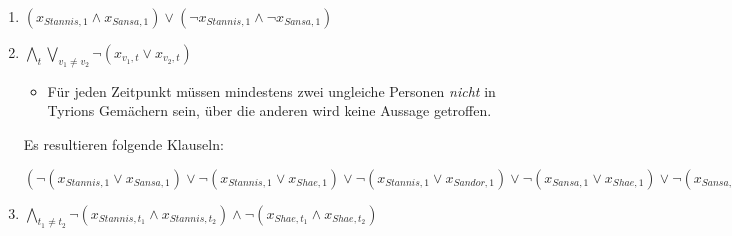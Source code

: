 \documentclass{article}
\begin{document}
\renewcommand{\labelenumi}{(\arabic{enumi})}
\begin{enumerate}
   \item $(x_{Stannis,1} \wedge x_{Sansa,1}) \vee (\neg x_{Stannis,1} \wedge
      \neg x_{Sansa,1})$
   \item $\bigwedge\limits_t\bigvee\limits_{v_1 \neq v_2} \neg(x_{v_1,t} \vee
      x_{v_2,t})$ 
      \begin{itemize}[label=$\rightarrow$]
         \item Für jeden Zeitpunkt müssen mindestens zwei ungleiche Personen
            \emph{nicht} in Tyrions Gemächern sein, über die anderen wird keine
            Aussage getroffen. 
      \end{itemize}
      Es resultieren folgende Klauseln:


      $ (\neg(x_{Stannis,1} \vee x_{Sansa,1}) \vee \neg(x_{Stannis,1} \vee
      x_{Shae,1}) \vee \neg(x_{Stannis,1} \vee x_{Sandor,1}) \vee
      \neg(x_{Sansa,1} \vee x_{Shae,1}) \vee \neg(x_{Sansa,1} \vee x_{Sandor,1})
      \vee \neg(x_{Shae,1} \vee x_{Sandor,1})) \wedge (\neg(x_{Stannis,2} \vee
      x_{Sansa,2}) \vee \neg(x_{Stannis,2} \vee x_{Shae,2}) \vee
      \neg(x_{Stannis,2} \vee x_{Sandor,2}) \vee \neg(x_{Sansa,2} \vee
      x_{Shae,2}) \vee \neg(x_{Sansa,2} \vee x_{Sandor,2}) \vee \neg(x_{Shae,2}
      \vee x_{Sandor,2})) \wedge (\neg(x_{Stannis,3} \vee x_{Sansa,3}) \vee
      \neg(x_{Stannis,3} \vee x_{Shae,3}) \vee \neg(x_{Stannis,3} \vee
      x_{Sandor,3}) \vee \neg(x_{Sansa,3} \vee x_{Shae,3}) \vee \neg(x_{Sansa,3}
      \vee x_{Sandor,3}) \vee \neg(x_{Shae,3} \vee x_{Sandor,3})) $

   \item $\bigwedge\limits_{t_1\neq t_2} \neg(x_{Stannis,t_1} \wedge
      x_{Stannis,t_2}) \wedge \neg(x_{Shae,t_1} \wedge x_{Shae,t_2})$


\end{enumerate}
\end{document}
